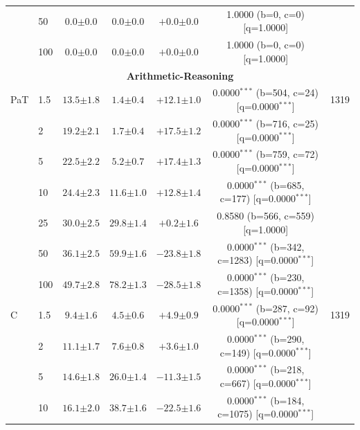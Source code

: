 \begin{table}[h!]
\begin{tabular}{l l cccc c}
 & 50 & $0.0 {\scriptstyle \pm 0.0}$ & $0.0 {\scriptstyle \pm 0.0}$ & $+0.0 {\scriptstyle \pm 0.0}$ & 1.0000 (b=0, c=0) [q=1.0000] &  \\
 & 100 & $0.0 {\scriptstyle \pm 0.0}$ & $0.0 {\scriptstyle \pm 0.0}$ & $+0.0 {\scriptstyle \pm 0.0}$ & 1.0000 (b=0, c=0) [q=1.0000] &  \\
\midrule
\multicolumn{7}{c}{\textbf{Arithmetic-Reasoning}} \\
\midrule
PaT & 1.5 & $13.5 {\scriptstyle \pm 1.8}$ & $1.4 {\scriptstyle \pm 0.4}$ & $+12.1 {\scriptstyle \pm 1.0}$ & 0.0000$^{***}$ (b=504, c=24) [q=0.0000$^{***}$] & 1319 \\
 & 2 & $19.2 {\scriptstyle \pm 2.1}$ & $1.7 {\scriptstyle \pm 0.4}$ & $+17.5 {\scriptstyle \pm 1.2}$ & 0.0000$^{***}$ (b=716, c=25) [q=0.0000$^{***}$] &  \\
 & 5 & $22.5 {\scriptstyle \pm 2.2}$ & $5.2 {\scriptstyle \pm 0.7}$ & $+17.4 {\scriptstyle \pm 1.3}$ & 0.0000$^{***}$ (b=759, c=72) [q=0.0000$^{***}$] &  \\
 & 10 & $24.4 {\scriptstyle \pm 2.3}$ & $11.6 {\scriptstyle \pm 1.0}$ & $+12.8 {\scriptstyle \pm 1.4}$ & 0.0000$^{***}$ (b=685, c=177) [q=0.0000$^{***}$] &  \\
 & 25 & $30.0 {\scriptstyle \pm 2.5}$ & $29.8 {\scriptstyle \pm 1.4}$ & $+0.2 {\scriptstyle \pm 1.6}$ & 0.8580 (b=566, c=559) [q=1.0000] &  \\
 & 50 & $36.1 {\scriptstyle \pm 2.5}$ & $59.9 {\scriptstyle \pm 1.6}$ & $-23.8 {\scriptstyle \pm 1.8}$ & 0.0000$^{***}$ (b=342, c=1283) [q=0.0000$^{***}$] &  \\
 & 100 & $49.7 {\scriptstyle \pm 2.8}$ & $78.2 {\scriptstyle \pm 1.3}$ & $-28.5 {\scriptstyle \pm 1.8}$ & 0.0000$^{***}$ (b=230, c=1358) [q=0.0000$^{***}$] &  \\
\midrule
C & 1.5 & $9.4 {\scriptstyle \pm 1.6}$ & $4.5 {\scriptstyle \pm 0.6}$ & $+4.9 {\scriptstyle \pm 0.9}$ & 0.0000$^{***}$ (b=287, c=92) [q=0.0000$^{***}$] & 1319 \\
 & 2 & $11.1 {\scriptstyle \pm 1.7}$ & $7.6 {\scriptstyle \pm 0.8}$ & $+3.6 {\scriptstyle \pm 1.0}$ & 0.0000$^{***}$ (b=290, c=149) [q=0.0000$^{***}$] &  \\
 & 5 & $14.6 {\scriptstyle \pm 1.8}$ & $26.0 {\scriptstyle \pm 1.4}$ & $-11.3 {\scriptstyle \pm 1.5}$ & 0.0000$^{***}$ (b=218, c=667) [q=0.0000$^{***}$] &  \\
 & 10 & $16.1 {\scriptstyle \pm 2.0}$ & $38.7 {\scriptstyle \pm 1.6}$ & $-22.5 {\scriptstyle \pm 1.6}$ & 0.0000$^{***}$ (b=184, c=1075) [q=0.0000$^{***}$] &  \\

\end{tabular}
\end{table}
